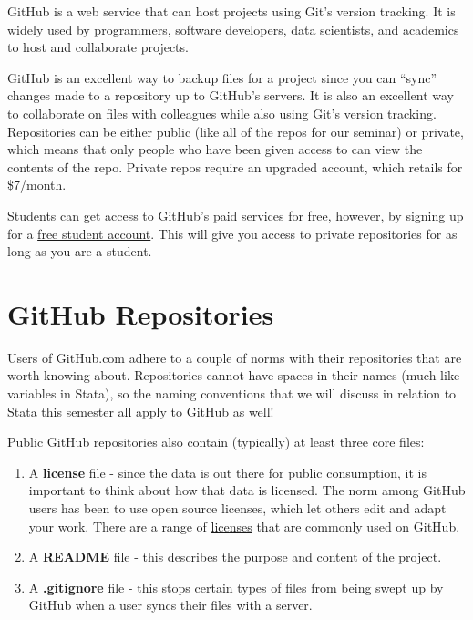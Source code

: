 \documentclass[]{book}
\begin{document}
GitHub is a web service that can host projects using Git's version
tracking. It is widely used by programmers, software developers, data
scientists, and academics to host and collaborate projects.

GitHub is an excellent way to backup files for a project since you can
``sync'' changes made to a repository up to GitHub's servers. It is also
an excellent way to collaborate on files with colleagues while also
using Git's version tracking. Repositories can be either public (like
all of the repos for our seminar) or private, which means that only
people who have been given access to can view the contents of the repo.
Private repos require an upgraded account, which retails for \$7/month.

Students can get access to GitHub's paid services for free, however, by
signing up for a \href{https://education.github.com}{free student
account}. This will give you access to private repositories for as long
as you are a student.

\section{GitHub Repositories}\label{github-repositories}

Users of GitHub.com adhere to a couple of norms with their repositories
that are worth knowing about. Repositories cannot have spaces in their
names (much like variables in Stata), so the naming conventions that we
will discuss in relation to Stata this semester all apply to GitHub as
well!

Public GitHub repositories also contain (typically) at least three core
files:

\begin{enumerate}
\def\labelenumi{\arabic{enumi}.}
\item
  A \textbf{license} file - since the data is out there for public
  consumption, it is important to think about how that data is licensed.
  The norm among GitHub users has been to use open source licenses,
  which let others edit and adapt your work. There are a range of
  \href{http://choosealicense.com}{licenses} that are commonly used on
  GitHub.
\item
  A \textbf{README} file - this describes the purpose and content of the
  project.
\item
  A \textbf{.gitignore} file - this stops certain types of files from
  being swept up by GitHub when a user syncs their files with a server.
\end{enumerate}
\end{document}
